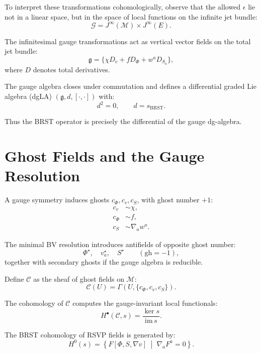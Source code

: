 To interpret these transformations cohomologically, observe that the allowed
$\epsilon$ lie not in a linear space, but in the space of local functions on
the infinite jet bundle:
\[
\mathscr{G} = J^\infty(\mathcal{M}) \times J^\infty(E).
\]

The infinitesimal gauge transformations act as vertical vector fields on the
total jet bundle:
\[
\mathfrak{g}
  = \{ \chi D_v + f D_\Phi + w^a D_{S_a} \},
\]
where $D$ denotes total derivatives.

\begin{proposition}
The gauge algebra closes under commutation and defines a differential graded
Lie algebra (dgLA) $(\mathfrak{g}, d, [\cdot,\cdot])$ with:
\[
d^2 = 0, \qquad d = s_\mathrm{BRST}.
\]
\end{proposition}

Thus the BRST operator is precisely the differential of the gauge dg-algebra.

\section{Ghost Fields and the Gauge Resolution}

A gauge symmetry induces ghosts $c_\Phi, c_v, c_S$, with ghost number $+1$:
\begin{align}
 c_v &\sim \chi, \\
 c_\Phi &\sim f, \\
 c_S &\sim \nabla_a w^a.
\end{align}

The minimal BV resolution introduces antifields of opposite ghost number:
\[
\Phi^\star, \quad v^\star_a, \quad S^\star
\qquad (\mathrm{gh}=-1),
\]
together with secondary ghosts if the gauge algebra is reducible.

\begin{definition}
Define $\mathscr{C}$ as the sheaf of ghost fields on $\mathcal{M}$:
\[
\mathscr{C}(U) =
\Gamma\!\left(U, \{c_\Phi, c_v, c_S\}\right).
\]
\end{definition}

The cohomology of $\mathscr{C}$ computes the gauge-invariant local functionals:
\[
H^\bullet(\mathscr{C}, s)
  = \frac{\ker s}{\mathrm{im}\, s}.
\]

\begin{theorem}
The BRST cohomology of RSVP fields is generated by:
\[
H^0(s)
  = \left\{
      F[\Phi, S, \nabla v]
      \;\middle|\;
      \nabla_a F^a = 0
    \right\}.
\]
\end{theorem}

